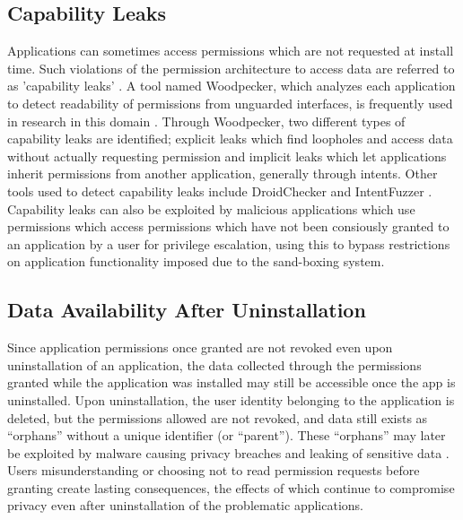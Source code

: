 \subsection{Capability Leaks}
Applications can sometimes access permissions which are not requested at install time. Such violations of the permission architecture to access data are referred to as 'capability leaks' \cite{grace2012systematic} \cite{grace2011detecting}. A tool named Woodpecker, which analyzes each application to detect readability of permissions from unguarded interfaces, is frequently used in research in this domain \cite{zhou2012hey}. Through Woodpecker, two different types of capability leaks are identified; explicit leaks which find loopholes and access data without actually requesting permission and implicit leaks which let applications inherit permissions from another application, generally through intents. Other tools used to detect capability leaks include DroidChecker and IntentFuzzer \cite{yang2014intentfuzzer} \cite{chan2012droidchecker}. Capability leaks can also be exploited by malicious applications which use permissions which access permissions which have not been consiously granted to an application by a user for privilege escalation, using this to bypass restrictions on application functionality imposed due to the sand-boxing system\cite{davi2010privilege}.  

\subsection{Data Availability After Uninstallation}
Since application permissions once granted are not revoked even upon uninstallation of an application, the data collected through the permissions granted while the application was installed may still be accessible once the app is uninstalled. Upon uninstallation, the user identity belonging to the application is deleted, but the permissions allowed are not revoked, and data still exists as “orphans” without a unique identifier (or “parent”). These “orphans” may later be exploited by malware causing privacy breaches and leaking of sensitive data \cite{zhang2016life}. Users misunderstanding or choosing not to read permission requests before granting create lasting consequences, the effects of which continue to compromise privacy even after uninstallation of the problematic applications.

